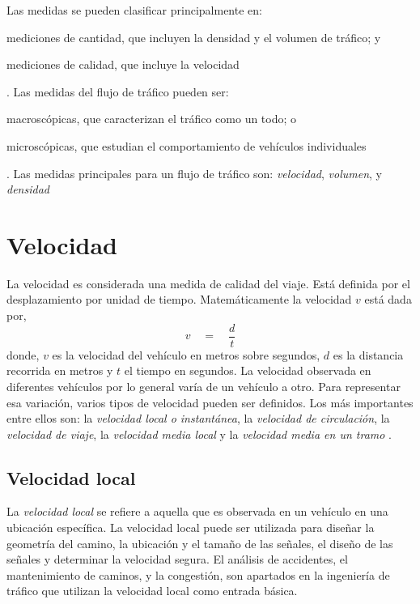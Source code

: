 Las medidas se pueden clasificar principalmente en: \begin{enumerate*}[a)]
\item mediciones de cantidad, que incluyen la densidad y el volumen de tráfico; y \item mediciones de calidad, que incluye la velocidad
\end{enumerate*}. Las medidas del flujo de tráfico pueden ser: \begin{enumerate*}[a)] \item macroscópicas, que caracterizan el tráfico como un todo; o \item microscópicas, que estudian el comportamiento de vehículos individuales \end{enumerate*}. Las medidas principales para un flujo de tráfico son: \emph{velocidad}, \emph{volumen}, y \emph{densidad} \citep{may1990fundamentals}

\section{Velocidad}

La velocidad es considerada una medida de calidad del viaje. Está definida por el desplazamiento por unidad de tiempo. Matemáticamente la velocidad $v$ está dada por,
\begin{equation}
v\quad =\quad \frac { d }{ t }
\end{equation}
donde, $v$ es la velocidad del vehículo en metros sobre segundos, $d$ es la distancia recorrida en metros y $t$ el tiempo en segundos. La velocidad observada en diferentes vehículos por lo general varía de un vehículo a otro. Para representar esa variación, varios tipos de velocidad pueden ser definidos. Los más importantes entre ellos son: la \emph{velocidad local o instantánea}, la \emph{velocidad de circulación}, la \emph{velocidad de viaje}, la \emph{velocidad media local} y la \emph{velocidad media en un tramo} \citep{may1990fundamentals}.

\subsection{Velocidad local}

La \emph{velocidad local} se refiere a aquella que es observada en un vehículo en una ubicación específica. La velocidad local puede ser utilizada para diseñar la geometría del camino, la ubicación y el tamaño de las señales, el diseño de las señales y determinar la velocidad segura. El análisis de accidentes, el mantenimiento de caminos, y la congestión, son apartados en la ingeniería de tráfico que utilizan la velocidad local como entrada básica.

